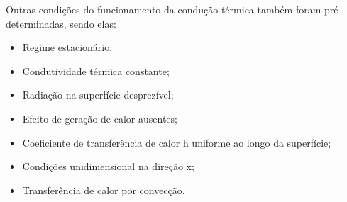 Outras condições do funcionamento da condução térmica também foram pré-determinadas, sendo elas:
\vspace{-0.5cm}
\begin{itemize}[leftmargin=2cm]
    \vspace{-0.15cm}\item Regime estacionário;
          \vspace{-0.15cm}\item Condutividade térmica constante;
          \vspace{-0.15cm}\item Radiação na superfície desprezível;
          \vspace{-0.15cm}\item Efeito de geração de calor ausentes;
          \vspace{-0.15cm}\item Coeficiente de transferência de calor h uniforme ao longo da superfície;
          \vspace{-0.15cm}\item Condições unidimensional na direção x;
          \vspace{-0.15cm}\item Transferência de calor por convecção.
\end{itemize}

